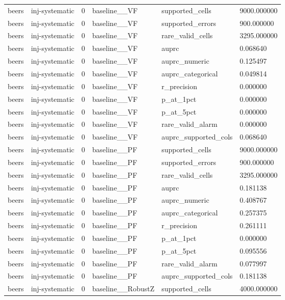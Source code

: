 \begin{tabular}{llllll}
beers & inj-systematic & 0 & baseline\_\_VF & supported\_cells & 9000.000000 \\
beers & inj-systematic & 0 & baseline\_\_VF & supported\_errors & 900.000000 \\
beers & inj-systematic & 0 & baseline\_\_VF & rare\_valid\_cells & 3295.000000 \\
beers & inj-systematic & 0 & baseline\_\_VF & auprc & 0.068640 \\
beers & inj-systematic & 0 & baseline\_\_VF & auprc\_numeric & 0.125497 \\
beers & inj-systematic & 0 & baseline\_\_VF & auprc\_categorical & 0.049814 \\
beers & inj-systematic & 0 & baseline\_\_VF & r\_precision & 0.000000 \\
beers & inj-systematic & 0 & baseline\_\_VF & p\_at\_1pct & 0.000000 \\
beers & inj-systematic & 0 & baseline\_\_VF & p\_at\_5pct & 0.000000 \\
beers & inj-systematic & 0 & baseline\_\_VF & rare\_valid\_alarm & 0.000000 \\
beers & inj-systematic & 0 & baseline\_\_VF & auprc\_supported\_cols & 0.068640 \\
beers & inj-systematic & 0 & baseline\_\_PF & supported\_cells & 9000.000000 \\
beers & inj-systematic & 0 & baseline\_\_PF & supported\_errors & 900.000000 \\
beers & inj-systematic & 0 & baseline\_\_PF & rare\_valid\_cells & 3295.000000 \\
beers & inj-systematic & 0 & baseline\_\_PF & auprc & 0.181138 \\
beers & inj-systematic & 0 & baseline\_\_PF & auprc\_numeric & 0.408767 \\
beers & inj-systematic & 0 & baseline\_\_PF & auprc\_categorical & 0.257375 \\
beers & inj-systematic & 0 & baseline\_\_PF & r\_precision & 0.261111 \\
beers & inj-systematic & 0 & baseline\_\_PF & p\_at\_1pct & 0.000000 \\
beers & inj-systematic & 0 & baseline\_\_PF & p\_at\_5pct & 0.095556 \\
beers & inj-systematic & 0 & baseline\_\_PF & rare\_valid\_alarm & 0.077997 \\
beers & inj-systematic & 0 & baseline\_\_PF & auprc\_supported\_cols & 0.181138 \\
beers & inj-systematic & 0 & baseline\_\_RobustZ & supported\_cells & 4000.000000 \\

\end{tabular}
